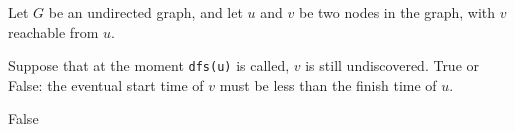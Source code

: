 \begin{prob}

    Let $G$ be an undirected graph, and let $u$ and $v$ be two nodes in the graph, with $v$ reachable from
    $u$.

    Suppose that at the moment \texttt{dfs(u)} is called, $v$ is still
    undiscovered. True or False: the eventual start time of $v$ must be less
    than the finish time of $u$.

    \tF{}

    \begin{soln}
        False
    \end{soln}
\end{prob}
